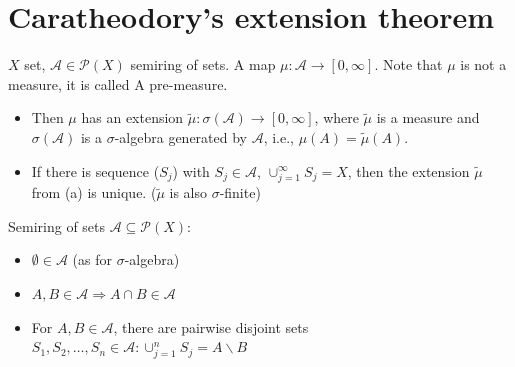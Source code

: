 \documentclass[../../note.tex]{subfiles}
\begin{document}
\section{Caratheodory's extension theorem}
\begin{theorem}
    \label{thm: caratheodory's extension theorem}
$X$ set, $\mathcal{A} \in \mathcal{P}(X)$ semiring of sets. A map $\mu: \mathcal{A} \rightarrow [0, \infty]$. Note that $\mu$ is not a measure, it is called A pre-measure.
\begin{itemize}
    \item Then $\mu$ has an extension $\tilde{\mu}: \sigma(\mathcal{A}) \rightarrow [0, \infty]$, where $\tilde{\mu}$ is a measure and $\sigma(\mathcal{A})$ is a $\sigma$-algebra generated by $\mathcal{A}$, i.e., $\mu(A) = \tilde{\mu}(A)$.
    \item If there is sequence ($S_j$) with $S_j \in \mathcal{A}$, $\cup_{j=1}^{\infty} S_j = X$, then the extension $\tilde{\mu}$ from (a) is unique. ($\tilde{\mu}$ is also $\sigma$-finite)
\end{itemize}
\end{theorem}

\begin{definition}
    Semiring of sets $\mathcal{A} \subseteq \mathcal{P}(X)$:
    \begin{itemize}
        \item $\emptyset \in \mathcal{A}$ (as for $\sigma$-algebra)
        \item $A,B \in \mathcal{A} \Longrightarrow A \cap B \in \mathcal{A}$
        \item For $A,B \in \mathcal{A}$, there are pairwise disjoint sets $S_1, S_2,\dots, S_n \in \mathcal{A}: \cup_{j=1}^n S_j =  A \backslash B$ 
    \end{itemize}
\end{definition}
\end{document}
